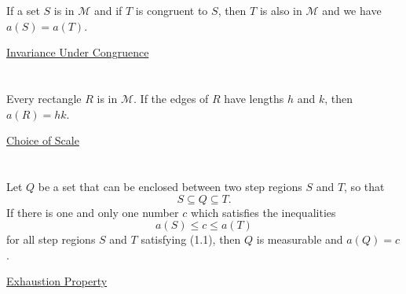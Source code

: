 \documentclass{article}
\newcommand{\lean}[2]{\href{./Area.html\##1}{#2}}
\begin{document}
If a set $S$ is in $\mathscr{M}$ and if $T$ is congruent to $S$, then $T$ is
  also in $\mathscr{M}$ and we have $a(S) = a(T)$.

\begin{axiom}

  \lean{Invariant-Under-Congruence}{Invariance Under Congruence}

\end{axiom}

\section*{}%
\label{sec:choice-scale}

Every rectangle $R$ is in $\mathscr{M}$.
If the edges of $R$ have lengths $h$ and $k$, then $a(R) = hk$.

\begin{axiom}

  \lean{Choice-of-Scale}{Choice of Scale}

\end{axiom}

\section*{}%
%

Let $Q$ be a set that can be enclosed between two step regions $S$ and $T$, so
  that
  \begin{equation}
    \label{sec:exhaustion-property-eq1}
    S \subseteq Q \subseteq T.
  \end{equation}
If there is one and only one number $c$ which satisfies the inequalities
  $$a(S) \leq c \leq a(T)$$ for all step regions $S$ and $T$ satisfying (1.1),
  then $Q$ is measurable and $a(Q) = c$.

\begin{axiom}

  \lean{Exhaustion-Property}{Exhaustion Property}

\end{axiom}
\end{document}
